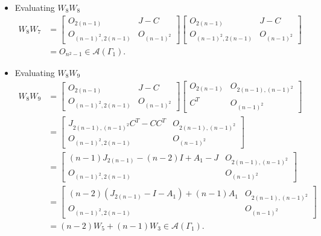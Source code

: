 \begin{itemize}
    \item Evaluating $W_8W_8$
    \begin{align*}
        W_8W_7
        &= \begin{bmatrix}
            O_{2(n-1)} & J-C \\
            O_{(n-1)^2, 2(n-1)} & O_{(n-1)^2}
        \end{bmatrix}\begin{bmatrix}
            O_{2(n-1)} & J-C \\
            O_{(n-1)^2, 2(n-1)} & O_{(n-1)^2}
        \end{bmatrix}\\
        &= O_{n^2-1}\in\mathcal{A}(\Gamma_1).
    \end{align*}
    
    \item Evaluating $W_8W_9$
    \begin{align*}
        W_8W_9
        &= \begin{bmatrix}
            O_{2(n-1)} & J-C \\
            O_{(n-1)^2, 2(n-1)} & O_{(n-1)^2}
        \end{bmatrix}\begin{bmatrix}
            O_{2(n-1)} & O_{2(n-1),(n-1)^2} \\
            C^T & O_{(n-1)^2}
        \end{bmatrix}\\
        &= \begin{bmatrix}
            J_{2(n-1),(n-1)^2}C^T - CC^T & O_{2(n-1), (n-1)^2} \\
            O_{(n-1)^2, 2(n-1)} & O_{(n-1)^2}
        \end{bmatrix}\\
        &= \begin{bmatrix}
            (n-1)J_{2(n-1)} - (n-2)I + A_1 - J & O_{2(n-1), (n-1)^2} \\
            O_{(n-1)^2, 2(n-1)} & O_{(n-1)^2}
        \end{bmatrix}\\
        &= \begin{bmatrix}
            (n-2)(J_{2(n-1)} - I - A_1)  + (n-1)A_1 & O_{2(n-1), (n-1)^2} \\
            O_{(n-1)^2, 2(n-1)} & O_{(n-1)^2}
        \end{bmatrix}\\
        &=(n-2)W_5 + (n-1)W_3\in\mathcal{A}(\Gamma_1).
    \end{align*}
    

\end{itemize}
